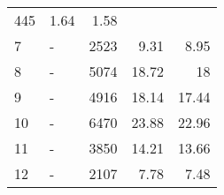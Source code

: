 \begin{longtable}{lXrrr}
       \num{445} &
       \num[round-mode=places,round-precision=2]{1,64} &
         \num[round-mode=places,round-precision=2]{1,58} \\

     7 &
     \multicolumn{1}{X}{ -  } &


       \num{2523} &
       \num[round-mode=places,round-precision=2]{9,31} &
         \num[round-mode=places,round-precision=2]{8,95} \\

     8 &
     \multicolumn{1}{X}{ -  } &


       \num{5074} &
       \num[round-mode=places,round-precision=2]{18,72} &
         \num[round-mode=places,round-precision=2]{18} \\

     9 &
     \multicolumn{1}{X}{ -  } &


       \num{4916} &
       \num[round-mode=places,round-precision=2]{18,14} &
         \num[round-mode=places,round-precision=2]{17,44} \\

     10 &
     \multicolumn{1}{X}{ -  } &


       \num{6470} &
       \num[round-mode=places,round-precision=2]{23,88} &
         \num[round-mode=places,round-precision=2]{22,96} \\

     11 &
     \multicolumn{1}{X}{ -  } &


       \num{3850} &
       \num[round-mode=places,round-precision=2]{14,21} &
         \num[round-mode=places,round-precision=2]{13,66} \\

     12 &
     \multicolumn{1}{X}{ -  } &


       \num{2107} &
       \num[round-mode=places,round-precision=2]{7,78} &
         \num[round-mode=places,round-precision=2]{7,48} \\


\end{longtable}
